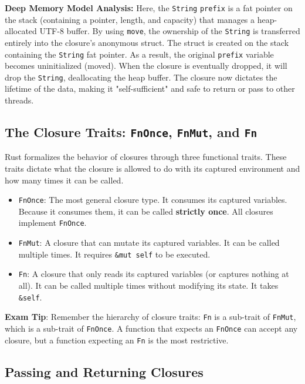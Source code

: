 \textbf{Deep Memory Model Analysis:} Here, the \texttt{String} \texttt{prefix} is a fat pointer on the stack (containing a pointer, length, and capacity) that manages a heap-allocated UTF-8 buffer. By using \texttt{move}, the ownership of the \texttt{String} is transferred entirely into the closure's anonymous struct. The struct is created on the stack containing the \texttt{String} fat pointer. As a result, the original \texttt{prefix} variable becomes uninitialized (moved). When the closure is eventually dropped, it will drop the \texttt{String}, deallocating the heap buffer. The closure now dictates the lifetime of the data, making it "self-sufficient" and safe to return or pass to other threads.

\subsection{The Closure Traits: \texttt{FnOnce}, \texttt{FnMut}, and \texttt{Fn}}

Rust formalizes the behavior of closures through three functional traits. These traits dictate what the closure is allowed to do with its captured environment and how many times it can be called.

\begin{itemize}
    \item \texttt{FnOnce}: The most general closure type. It consumes its captured variables. Because it consumes them, it can be called \textbf{strictly once}. All closures implement \texttt{FnOnce}.
    \item \texttt{FnMut}: A closure that can mutate its captured variables. It can be called multiple times. It requires \texttt{\&mut self} to be executed.
    \item \texttt{Fn}: A closure that only reads its captured variables (or captures nothing at all). It can be called multiple times without modifying its state. It takes \texttt{\&self}.
\end{itemize}

\begin{exambox}
\textbf{Exam Tip}: Remember the hierarchy of closure traits: \texttt{Fn} is a sub-trait of \texttt{FnMut}, which is a sub-trait of \texttt{FnOnce}. A function that expects an \texttt{FnOnce} can accept any closure, but a function expecting an \texttt{Fn} is the most restrictive.
\end{exambox}

\subsection{Passing and Returning Closures}

